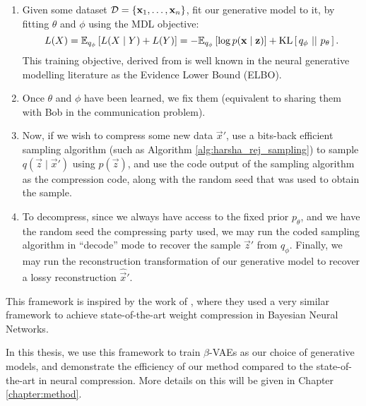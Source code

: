 \begin{enumerate}
\item Given some dataset $\mathcal{D} = \{\mathbf{x}_1, \hdots, \mathbf{x}_n\}$, fit our
  generative model to it, by fitting $\theta$ and $\phi$ using the MDL
  objective:
  \begin{equation}
    \label{eq:mdl_elbo}
    L(X) = \Exp{L(X \mid Y) + L(Y)}{q_\phi}
         =  -\Exp{\log p(\vec{x} \mid \vec{z})}{q_\phi} + \KL{q_\phi}{p_\theta}.
  \end{equation}
  This training objective, derived from \cite{hinton1993keeping} is well known
  in the neural generative modelling literature as the Evidence Lower Bound (ELBO).

  \item Once $\theta$ and $\phi$ have been learned, we fix them (equivalent to
    sharing them with Bob in the communication problem).

  \item Now, if we wish to compress some new data $\vec{x}'$, use a bits-back
    efficient sampling algorithm (such as Algorithm
    \ref{alg:harsha_rej_sampling}) to sample $q(\vec{z} \mid \vec{x}')$ using
    $p(\vec{z})$, and use the code output of the sampling algorithm as the
    compression code, along with the random seed that was used to obtain the sample. 

  \item To decompress, since we always have access to the fixed prior
    $p_\theta$, and we have the random seed the compressing party used, we may
    run the coded sampling algorithm in ``decode'' mode to recover the sample $\vec{z}'$
    from $q_\phi$. Finally, we may run the reconstruction transformation of our
    generative model to recover a lossy reconstruction $\hat{\vec{x}}'$.
\end{enumerate}

\par 
This framework is inspired by the work of \cite{havasi2018minimal}, where they
used a very similar framework to achieve state-of-the-art weight compression in
Bayesian Neural Networks.
\par
In this thesis, we use this framework to train $\beta$-VAEs as our choice of
generative models, and demonstrate the efficiency of our method compared to the
state-of-the-art in neural compression. More details on this will be given in
Chapter \ref{chapter:method}. 

